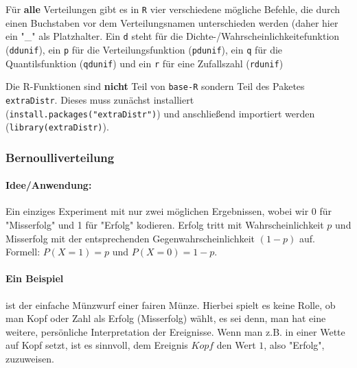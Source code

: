 \documentclass[a4paper]{article}
\newcommand\dangersign[1][2ex]{%
  \renewcommand\stacktype{L}%
  \scaleto{\stackon[1.3pt]{\color{red}$\triangle$}{\tiny !}}{#1}%
}
\begin{document}
\noindent \dangersign[3ex] Für \textbf{alle} Verteilungen gibt es in \texttt{R} vier verschiedene mögliche Befehle, die durch einen Buchstaben vor dem Verteilungsnamen unterschieden werden (daher hier ein "\_" als Platzhalter. Ein \texttt{d} steht für die Dichte-/Wahrscheinlichkeitefunktion (\texttt{ddunif}), ein \texttt{p} für die Verteilungsfunktion (\texttt{pdunif}), ein \texttt{q} für die Quantilsfunktion (\texttt{qdunif}) und ein \texttt{r} für eine Zufallszahl (\texttt{rdunif})

\noindent \dangersign[3ex] Die R-Funktionen sind \textbf{nicht} Teil von \texttt{base-R} sondern Teil des Paketes \texttt{extraDistr}. Dieses muss zunächst installiert (\texttt{install.packages("extraDistr")}) und anschließend importiert werden (\texttt{library(extraDistr)}).

\subsubsection{Bernoulliverteilung} \label{sec:Ber}

\paragraph{Idee/Anwendung:}  Ein einziges Experiment mit nur zwei möglichen Ergebnissen, wobei wir 0 für "Misserfolg" und 1 für "Erfolg" kodieren. Erfolg tritt mit Wahrscheinlichkeit $p$ und Misserfolg mit der entsprechenden Gegenwahrscheinlichkeit $(1-p)$ auf. Formell: $P(X=1)=p$ und $P(X=0)=1-p$. 

\paragraph{Ein Beispiel} ist der einfache Münzwurf einer fairen Münze. Hierbei spielt es keine Rolle, ob man Kopf oder Zahl als Erfolg (Misserfolg) wählt, es sei denn, man hat eine weitere, persönliche Interpretation der Ereignisse. Wenn man z.B. in einer Wette auf Kopf setzt, ist es sinnvoll, dem Ereignis $Kopf$ den Wert $1$, also "Erfolg", zuzuweisen.
\end{document}
